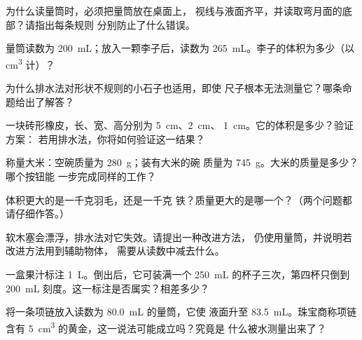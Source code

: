 \begin{exercise}[$\star$]\label{exo:g6:mass-and-volume:3}
为什么读量筒时，必须把量筒放在桌面上，
视线与液面齐平，并读取弯月面的底部？请指出每条规则
分别防止了什么错误。
\end{exercise}

\begin{exercise}[$\star$]\label{exo:g6:mass-and-volume:4}
量筒读数为 \qty{200}{mL}；放入一颗李子后，读数为
\qty{265}{mL}。李子的体积为多少（以 \unit{cm^3} 计）？
\end{exercise}

\begin{exercise}[$\star$]\label{exo:g6:mass-and-volume:5}
为什么排水法对形状不规则的小石子也适用，即使
尺子根本无法测量它？哪条命题给出了解答？
\end{exercise}

\begin{exercise}[$\star$]\label{exo:g6:mass-and-volume:6}
一块砖形橡皮，长、宽、高分别为 \qty{5}{cm}、\qty{2}{cm}、
\qty{1}{cm}。它的体积是多少？验证方案：
若用排水法，你将如何验证这一结果？
\end{exercise}

\begin{exercise}[$\star$]\label{exo:g6:mass-and-volume:7}
称量大米：空碗质量为 \qty{280}{g}；装有大米的碗
质量为 \qty{745}{g}。大米的质量是多少？哪个按钮能
一步完成同样的工作？
\end{exercise}

\begin{exercise}[$\star$]\label{exo:g6:mass-and-volume:8}
体积更大的是一千克羽毛，还是一千克
铁？质量更大的是哪一个？（两个问题都请仔细作答。）
\end{exercise}

\begin{exercise}[$\star\star$]\label{exo:g6:mass-and-volume:9}
软木塞会漂浮，排水法对它失效。请提出一种改进方法，
仍使用量筒，并说明若改进方法用到辅助物体，
需要从读数中减去什么。
\end{exercise}

\begin{exercise}[$\star\star$]\label{exo:g6:mass-and-volume:10}
一盒果汁标注 \qty{1}{L}。倒出后，它可装满一个
\qty{250}{mL} 的杯子三次，第四杯只倒到
\qty{200}{mL} 刻度。这一标注是否属实？相差多少？
\end{exercise}

\begin{exercise}[$\star\star$]\label{exo:g6:mass-and-volume:11}
将一条项链放入读数为 \qty{80.0}{mL} 的量筒，它使
液面升至 \qty{83.5}{mL}。珠宝商称项链含有
\qty{5}{cm^3} 的黄金，这一说法可能成立吗？究竟是
什么被水测量出来了？
\end{exercise}


